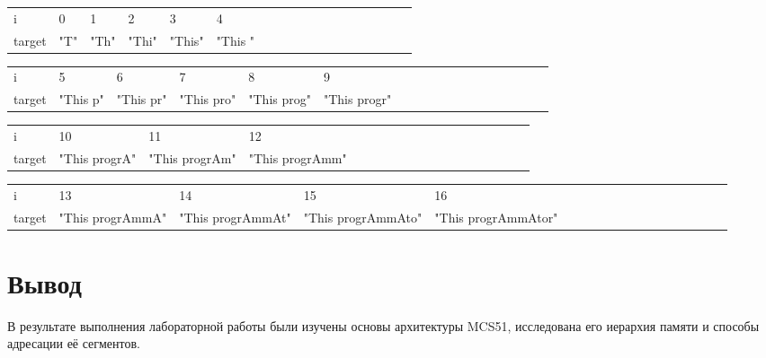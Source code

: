 \begin{flushleft}

	\scriptsize
	\begin{tabular}{llllllllllllllllll}
		i      & 0   & 1    & 2     & 3      & 4 \\
		target & "T" & "Th" & "Thi" & "This" & "This "
	\end{tabular}
	
	\begin{tabular}{llllllllllllllllll}
		i      & 5   & 6    & 7     & 8      & 9 \\
		target & "This p" & "This pr" & "This pro" & "This prog" & "This progr"
	\end{tabular}
	
	\begin{tabular}{llllllllllllllllll}
		i      & 10   & 11    & 12  \\
		target & "This progrA" & "This progrAm" & "This progrAmm"
	\end{tabular}
	
	\begin{tabular}{llllllllllllllllll}
		i      & 13      & 14  & 15  & 16   \\
		target & "This progrAmmA" & "This progrAmmAt" & "This progrAmmAto" & "This progrAmmAtor"
	\end{tabular}


\end{flushleft}

\section*{Вывод}
В результате выполнения лабораторной работы были изучены основы архитектуры MCS51, исследована его иерархия памяти и способы адресации её сегментов.


